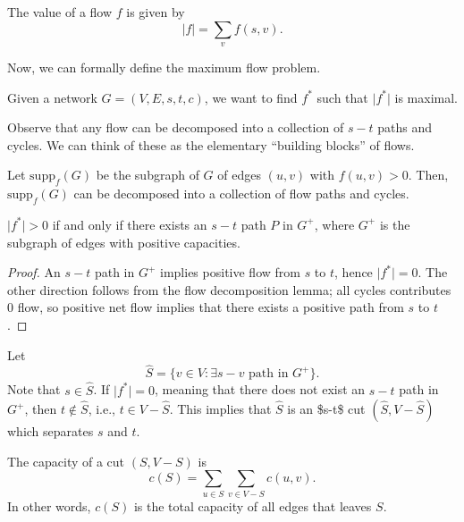 \begin{definition}

The \ac{value} of a flow $f$ is given by 
\[\vert f\vert = \sum_vf(s,v).\]
\end{definition}

Now, we can formally define the maximum flow problem. 
\begin{definition}

Given a network $G = (V,E,s,t,c)$, we want to find $f^*$ such that $\vert f^*\vert$ is maximal. 
\end{definition}

Observe that any flow can be decomposed into a collection of $s-t$ paths and cycles. We can think of these as the elementary ``building blocks'' of flows. 

\begin{theorem}

Let $\text{supp}_f(G)$ be the subgraph of $G$ of edges $(u,v)$ with $f(u,v) > 0$. Then, $\text{supp}_f(G)$ can be decomposed into a collection of flow paths and cycles. 
\end{theorem}


\begin{theorem}
\lemlabel

$\vert f^*\vert > 0$ if and only if there exists an $s-t$ path $P$ in $G^+$, where $G^+$ is the subgraph of edges with positive capacities.
\end{theorem}

\begin{proof}
An $s-t$ path in $G^+$ implies positive flow from $s$ to $t$, hence $\vert f^*\vert = 0$. The other direction follows from the flow decomposition lemma; all cycles contributes $0$ flow, so positive net flow implies that there exists a positive path from $s$ to $t$. 
\end{proof}

Let
\[\hat{S} = \{v\in V : \exists s-v\text{ path in }G^+\}.\]
Note that $s\in \hat{S}$. If $\vert f^*\vert = 0$, meaning that there does not exist an $s-t$ path in $G^+$, then $t\notin \hat{S}$, i.e., $t\in V-\hat{S}$. This implies that $\hat{S}$ is an \ac{$s-t$ cut} $(\hat{S}, V-\hat{S})$ which separates $s$ and $t$. 

\begin{definition}

The \ac{capacity} of a cut $(S, V-S)$ is
\[c(S) = \sum_{u\in S}\sum_{v\in V-S}c(u,v).\]
In other words, $c(S)$ is the total capacity of all edges that leaves $S$. 
\end{definition}

